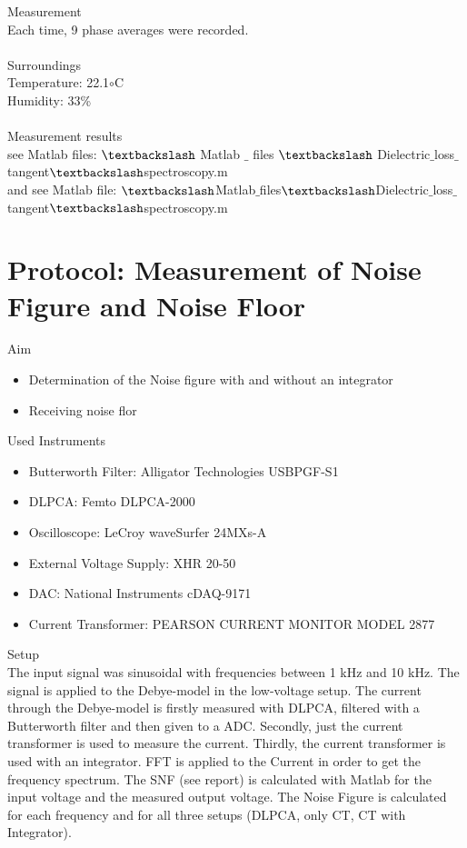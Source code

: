 {\Large Measurement} \\
Each time, 9 phase averages were recorded.\\ 
\\
{\Large  Surroundings} \\
Temperature: 22.1$\circ$C\\
Humidity: 33\%\\
\\
{\Large Measurement results}\\
see Matlab files: $\textbackslash$ Matlab $\_$ files $\textbackslash$ Dielectric$\_$loss$\_$tangent$\textbackslash$spectroscopy.m\\
and see Matlab file: $\textbackslash$Matlab$\_$files$\textbackslash$Dielectric$\_$loss$\_$tangent$\textbackslash$spectroscopy.m


\section{Protocol: Measurement of Noise Figure and Noise Floor}
{\Large Aim}
\begin{itemize}
\item Determination of the Noise figure with and without an integrator 
\item Receiving noise flor 
\end{itemize}
{\Large Used Instruments}
\begin{itemize}
 \item Butterworth Filter: Alligator Technologies USBPGF-S1
 \item DLPCA: Femto DLPCA-2000
 \item Oscilloscope: LeCroy waveSurfer 24MXs-A
 \item External Voltage Supply:  XHR 20-50
 \item DAC: National Instruments cDAQ-9171
 \item Current Transformer: PEARSON CURRENT
MONITOR MODEL 2877
\end{itemize}
{\Large Setup} \\
The input signal was  sinusoidal with frequencies between 1 kHz and 10 kHz. The signal is applied to the Debye-model in the low-voltage setup. The current through the Debye-model is firstly measured with DLPCA, filtered with a Butterworth filter and then given to a ADC. Secondly, just the current transformer is used to measure the current. Thirdly, the current transformer is used with an integrator.  FFT is applied to the Current in order to get the frequency spectrum. The SNF (see report) is calculated with Matlab for the input voltage and the measured output voltage. The Noise Figure is calculated for each frequency and for all three setups (DLPCA, only CT, CT with Integrator).
